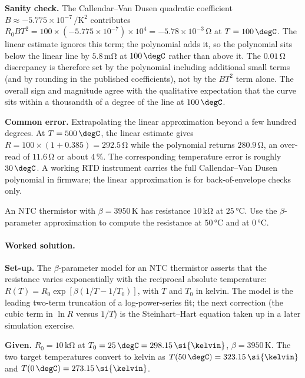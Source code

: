 \textbf{Sanity check.} The Callendar--Van Dusen quadratic
coefficient $B \approx -5.775 \times 10^{-7} \,\si{\per\kelvin
\squared}$ contributes $R_{0} B T^{2} = 100 \times (-5.775 \times
10^{-7}) \times 10^{4} = -5.78 \times 10^{-3} \,\si{\ohm}$ at $T
= 100 \,\degC$. The linear estimate ignores this term; the
polynomial adds it, so the polynomial sits below the linear line
by $5.8 \,\si{\milli\ohm}$ at $100 \,\degC$ rather than above it.
The $0.01 \,\si{\ohm}$ discrepancy is therefore set by the
polynomial including additional small terms (and by rounding in
the published coefficients), not by the $B T^{2}$ term alone. The
overall sign and magnitude agree with the qualitative expectation
that the curve sits within a thousandth of a degree of the line
at $100 \,\degC$.

\textbf{Common error.} Extrapolating the linear approximation
beyond a few hundred degrees. At $T = 500 \,\degC$, the linear
estimate gives $R = 100 \times (1 + 0.385) = 292.5 \,\si{\ohm}$
while the polynomial returns $280.9 \,\si{\ohm}$, an over-read of
$11.6 \,\si{\ohm}$ or about $4\,\%$. The corresponding temperature
error is roughly $30 \,\degC$. A working RTD instrument carries
the full Callendar--Van Dusen polynomial in firmware; the linear
approximation is for back-of-envelope checks only.

\begin{exercise}
An NTC thermistor with $\beta = 3950 \,\si{\kelvin}$ has resistance
$10 \,\si{\kilo\ohm}$ at $25 \,\si{\degreeCelsius}$. Use the
$\beta$-parameter approximation to compute the resistance at
$50 \,\si{\degreeCelsius}$ and at $0 \,\si{\degreeCelsius}$.
\end{exercise}

\paragraph{Worked solution.}
\textbf{Set-up.} The $\beta$-parameter model for an NTC thermistor
asserts that the resistance varies exponentially with the
reciprocal absolute temperature:
$R(T) = R_{0} \exp[\beta(1/T - 1/T_{0})]$, with $T$ and $T_{0}$ in
kelvin. The model is the leading two-term truncation of a
log-power-series fit; the next correction (the cubic term in
$\ln R$ versus $1/T$) is the Steinhart--Hart equation taken up in
a later simulation exercise.

\textbf{Given.} $R_{0} = 10 \,\si{\kilo\ohm}$ at $T_{0} = 25 \,
\degC = 298.15 \,\si{\kelvin}$, $\beta = 3950 \,\si{\kelvin}$. The
two target temperatures convert to kelvin as $T(50 \,\degC) =
323.15 \,\si{\kelvin}$ and $T(0 \,\degC) = 273.15 \,\si{\kelvin}$.

